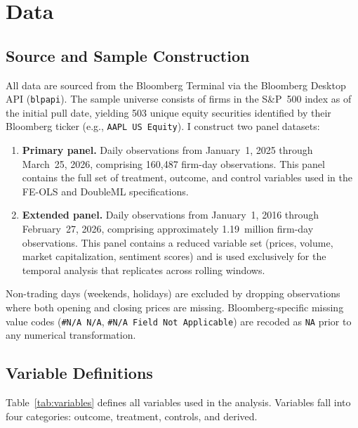 
\section{Data}
\label{sec:data}

\subsection{Source and Sample Construction}
\label{sec:data_source}

All data are sourced from the Bloomberg Terminal via the Bloomberg Desktop API (\texttt{blpapi}).
The sample universe consists of firms in the S\&P~500 index as of the initial pull date, yielding
503 unique equity securities identified by their Bloomberg ticker (e.g., \texttt{AAPL US Equity}).
I construct two panel datasets:

\begin{enumerate}
    \item \textbf{Primary panel.} Daily observations from January~1, 2025 through March~25, 2026,
    comprising 160,487 firm-day observations. This panel contains the full set of treatment,
    outcome, and control variables used in the FE-OLS and DoubleML specifications.

    \item \textbf{Extended panel.} Daily observations from January~1, 2016 through February~27,
    2026, comprising approximately 1.19~million firm-day observations. This panel contains a
    reduced variable set (prices, volume, market capitalization, sentiment scores) and is used
    exclusively for the temporal analysis that replicates \citet{gu2020} across rolling windows.
\end{enumerate}

Non-trading days (weekends, holidays) are excluded by dropping observations where both opening
and closing prices are missing. Bloomberg-specific missing value codes (\texttt{\#N/A N/A},
\texttt{\#N/A Field Not Applicable}) are recoded as \texttt{NA} prior to any numerical
transformation.

\subsection{Variable Definitions}
\label{sec:data_variables}

Table~\ref{tab:variables} defines all variables used in the analysis. Variables fall into four
categories: outcome, treatment, controls, and derived.

